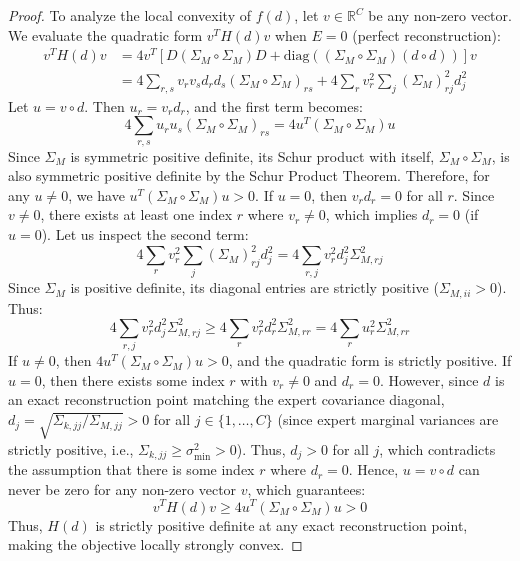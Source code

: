 \documentclass{article}
\theoremstyle{plain}
\theoremstyle{definition}
\theoremstyle{remark}
\begin{document}
\begin{proof}
To analyze the local convexity of $f(d)$, let $v \in \mathbb{R}^C$ be any non-zero vector. We evaluate the quadratic form $v^T H(d) v$ when $E = 0$ (perfect reconstruction):
\begin{align*}
  v^T H(d) v &= 4 v^T \left[ D (\Sigma_M \circ \Sigma_M) D + \text{diag}\left( (\Sigma_M \circ \Sigma_M) (d \circ d) \right) \right] v \\
  &= 4 \sum_{r,s} v_r v_s d_r d_s (\Sigma_M \circ \Sigma_M)_{rs} + 4 \sum_{r} v_r^2 \sum_{j} (\Sigma_M)_{rj}^2 d_j^2
\end{align*}
Let $u = v \circ d$. Then $u_r = v_r d_r$, and the first term becomes:
\begin{equation*}
  4 \sum_{r,s} u_r u_s (\Sigma_M \circ \Sigma_M)_{rs} = 4 u^T (\Sigma_M \circ \Sigma_M) u
\end{equation*}
Since $\Sigma_M$ is symmetric positive definite, its Schur product with itself, $\Sigma_M \circ \Sigma_M$, is also symmetric positive definite by the Schur Product Theorem. Therefore, for any $u \neq 0$, we have $u^T (\Sigma_M \circ \Sigma_M) u > 0$. If $u = 0$, then $v_r d_r = 0$ for all $r$.
Since $v \neq 0$, there exists at least one index $r$ where $v_r \neq 0$, which implies $d_r = 0$ (if $u = 0$).
Let us inspect the second term:
\begin{equation*}
  4 \sum_{r} v_r^2 \sum_{j} (\Sigma_M)_{rj}^2 d_j^2 = 4 \sum_{r, j} v_r^2 d_j^2 \Sigma_{M,rj}^2
\end{equation*}
Since $\Sigma_M$ is positive definite, its diagonal entries are strictly positive ($\Sigma_{M,ii} > 0$). Thus:
\begin{equation*}
  4 \sum_{r, j} v_r^2 d_j^2 \Sigma_{M,rj}^2 \geq 4 \sum_{r} v_r^2 d_r^2 \Sigma_{M,rr}^2 = 4 \sum_{r} u_r^2 \Sigma_{M,rr}^2
\end{equation*}
If $u \neq 0$, then $4 u^T (\Sigma_M \circ \Sigma_M) u > 0$, and the quadratic form is strictly positive.
If $u = 0$, then there exists some index $r$ with $v_r \neq 0$ and $d_r = 0$. However, since $d$ is an exact reconstruction point matching the expert covariance diagonal, $d_j = \sqrt{\Sigma_{k,jj}/\Sigma_{M,jj}} > 0$ for all $j \in \{1, \dots, C\}$ (since expert marginal variances are strictly positive, i.e., $\Sigma_{k,jj} \geq \sigma_{\min}^2 > 0$). Thus, $d_j > 0$ for all $j$, which contradicts the assumption that there is some index $r$ where $d_r = 0$.
Hence, $u = v \circ d$ can never be zero for any non-zero vector $v$, which guarantees:
\begin{equation*}
  v^T H(d) v \geq 4 u^T (\Sigma_M \circ \Sigma_M) u > 0
\end{equation*}
Thus, $H(d)$ is strictly positive definite at any exact reconstruction point, making the objective locally strongly convex.
\end{proof}
\end{document}

